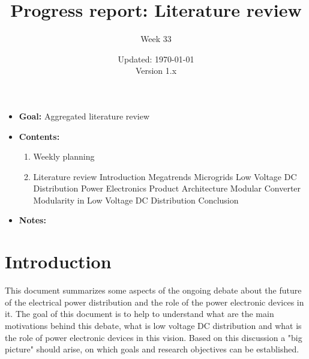 \documentclass[]{scrartcl}
\title{Progress report: Literature review}
\subtitle{Week 33}
\date{Updated: \today\\Version 1.x}
\begin{document}
	\begingroup
	\let\center\flushleft
	\let\endcenter\endflushleft
	\maketitle
	\endgroup
	
	\section*{}
	\begin{itemize}
		\item \textbf{Goal:} \subitem Aggregated literature review
		
		\item \textbf{Contents:}
		\begin{enumerate}
			\item Weekly planning
			\item Literature review
			\subitem Introduction
			\subitem Megatrends
			\subitem Microgrids
			\subitem Low Voltage DC Distribution 
			\subitem Power Electronics
			\subitem Product Architecture
			\subitem Modular Converter
			\subitem Modularity in Low Voltage DC Distribution
			\subitem Conclusion 
		\end{enumerate}
		\item \textbf{Notes:}
		\subitem 
		\subitem 
		\subitem
	\end{itemize}
	\newpage

\section{Introduction}

This document summarizes some aspects of the ongoing debate about the future of the electrical power distribution and the role of the power electronic devices in it. The goal of this document is to help to understand what are the main motivations behind this debate, what is low voltage DC distribution and what is the role of power electronic devices in this vision. Based on this discussion a "big picture" should arise, on which goals and research objectives can be established.  
\end{document}
